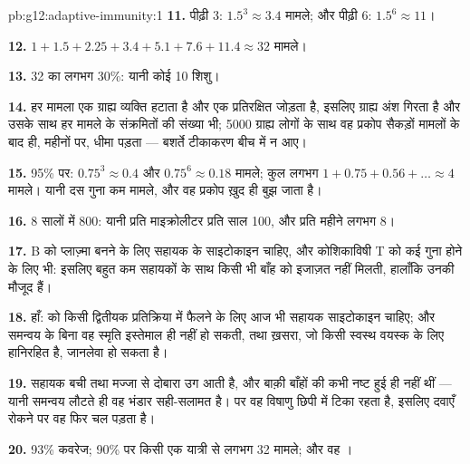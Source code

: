 \begin{solution}{pb:g12:adaptive-immunity:1}
\textbf{11.} पीढ़ी 3: $1.5^3 \approx 3.4$ मामले; और पीढ़ी 6:
$1.5^6 \approx 11$।

\textbf{12.} $1 + 1.5 + 2.25 + 3.4 + 5.1 + 7.6 + 11.4 \approx 32$ मामले।

\textbf{13.} 32 का लगभग 30\%: यानी कोई 10 शिशु।

\textbf{14.} हर मामला एक ग्राह्य व्यक्ति हटाता है और एक प्रतिरक्षित जोड़ता
है, इसलिए ग्राह्य अंश गिरता है और उसके साथ हर मामले के संक्रमितों की संख्या
भी; 5000 ग्राह्य लोगों के साथ वह प्रकोप सैकड़ों मामलों के बाद ही, महीनों पर,
धीमा पड़ता --- बशर्ते टीकाकरण बीच में न आए।

\textbf{15.} 95\% पर: $0.75^3 \approx 0.4$ और $0.75^6 \approx 0.18$
मामले; कुल लगभग $1 + 0.75 + 0.56 + \dots \approx 4$ मामले। यानी दस गुना कम
मामले, और वह प्रकोप ख़ुद ही बुझ जाता है।

\textbf{16.} 8 सालों में 800: यानी प्रति माइक्रोलीटर प्रति साल 100, और प्रति
महीने लगभग 8।

\textbf{17.} B  को प्लाज़्मा  बनने के लिए सहायक  के
साइटोकाइन चाहिए, और कोशिकाविषी T  को कई गुना होने के लिए भी: इसलिए
बहुत कम सहायकों के साथ किसी भी बाँह को इजाज़त नहीं मिलती, हालाँकि उनकी
 मौजूद हैं।

\textbf{18.} हाँ:  को किसी द्वितीयक प्रतिक्रिया में फैलने के
लिए आज भी सहायक साइटोकाइन चाहिए; और समन्वय के बिना वह स्मृति इस्तेमाल ही
नहीं हो सकती, तथा ख़सरा, जो किसी स्वस्थ वयस्क के लिए हानिरहित है, जानलेवा
हो सकता है।

\textbf{19.} सहायक  बची  तथा मज्जा से दोबारा उग आती है, और
बाक़ी बाँहों की  कभी नष्ट हुई ही नहीं थीं --- यानी समन्वय
लौटते ही वह भंडार सही-सलामत है। पर वह विषाणु छिपी  में टिका रहता है,
इसलिए दवाएँ रोकने पर वह फिर चल पड़ता है।

\textbf{20.} 93\% कवरेज; 90\% पर किसी एक यात्री से लगभग 32 मामले; और वह
।
\end{solution}
